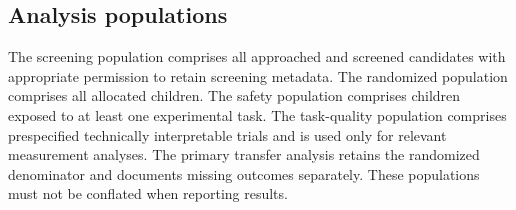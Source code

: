 \subsection{Analysis populations}
The screening population comprises all approached and screened candidates with appropriate permission to retain screening metadata. The randomized population comprises all allocated children. The safety population comprises children exposed to at least one experimental task. The task-quality population comprises prespecified technically interpretable trials and is used only for relevant measurement analyses. The primary transfer analysis retains the randomized denominator and documents missing outcomes separately. These populations must not be conflated when reporting results.